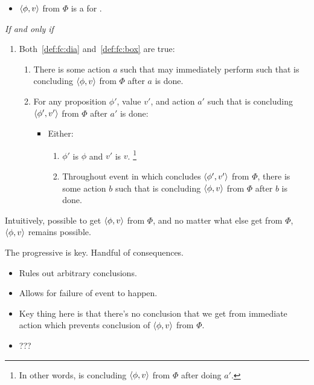 \begin{note}[\fc{2} definition]
\begin{definition}[\fc{3}]
    \begin{itemize}
    \item
      \(\langle \phi, v \rangle\) from \(\Phi\) is a \emph{} for \vAgent{}.
    \end{itemize}
    \emph{If and only if}
    \begin{enumerate}[label=]
    \item
      Both~\ref{def:fc:dia} and~\ref{def:fc:box} are true:
      \begin{enumerate}[label=\alph*., ref=(\alph*)]
      \item
        \label{def:fc:dia}
        There is some action \(a\) such that \vAgent{} may immediately perform such that \vAgent{} is concluding \(\langle \phi, v \rangle\) from \(\Phi\) after \(a\) is done.
      \item
        \label{def:fc:box}
        For any proposition \(\phi'\), value \(v'\), and action \(a'\) such that \vAgent{} is concluding \(\langle \phi', v' \rangle\) from \(\Phi\) after \(a'\) is done:
        \begin{itemize}
        \item
          Either:
          \begin{enumerate}[label=\arabic*., ref=(\arabic*)]
          \item
            \(\phi'\) is \(\phi\) and \(v'\) is \(v\).%
            \footnote{
              In other words, \vAgent{} is concluding \(\langle \phi, v \rangle\) from \(\Phi\) after doing \(a'\).
            }
          \item
            Throughout event in which \vAgent{} concludes \(\langle \phi', v' \rangle\) from \(\Phi\), there is some action \(b\) such that \vAgent{} is concluding \(\langle \phi, v \rangle\) from \(\Phi\) after \(b\) is done.
          \end{enumerate}
        \end{itemize}
      \end{enumerate}
    \end{enumerate}
    \vspace{-\baselineskip}
  \end{definition}

  Intuitively, possible to get \(\langle \phi, v \rangle\) from \(\Phi\), and no matter what else get from \(\Phi\), \(\langle \phi, v \rangle\) remains possible.

  The progressive is key.
  Handful of consequences.

  \begin{itemize}
  \item
    Rules out arbitrary conclusions.
  \item
    Allows for failure of event to happen.
  \item
    Key thing here is that there's no conclusion that we get from immediate action which prevents conclusion of \(\langle \phi, v \rangle\) from \(\Phi\).
  \item
    ???
  \end{itemize}
\end{note}


